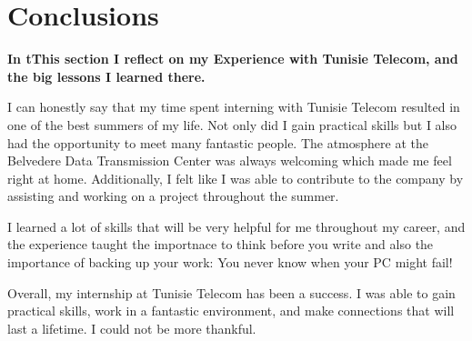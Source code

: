 \chapter{Conclusions}
\textbf{In tThis section I reflect on my Experience with Tunisie Telecom, and the big lessons I learned there.}


I can honestly say that my time spent interning with Tunisie Telecom resulted in one of the best summers of my life.  Not only did I gain practical skills but I also had the opportunity to meet many fantastic people. The atmosphere at the Belvedere Data Transmission Center was always welcoming which made me feel right at home. Additionally, I felt like I was able to contribute to the company by assisting and working on a project throughout the summer.

I learned a lot of skills that will be very helpful for me throughout my career, and the experience taught the importnace to think before you write and also the importance of backing up your work: You never know when your PC might fail!

Overall, my internship at Tunisie Telecom has been a success. I was able to gain practical skills, work in a fantastic environment, and make connections that will last a lifetime. I could not be more thankful.




